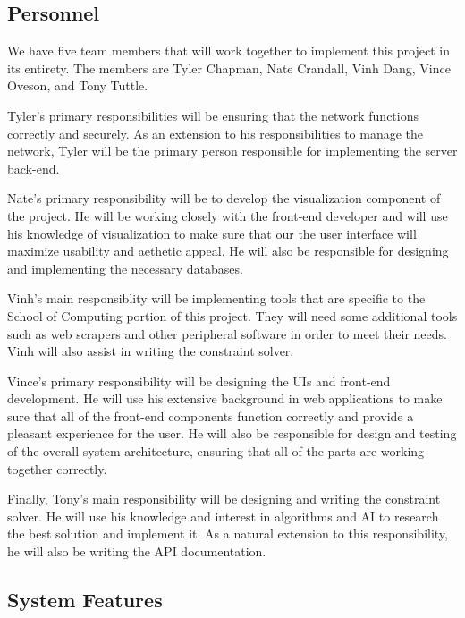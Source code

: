 \documentclass{extarticle}
\begin{document}
\subsection{Personnel}

We have five team members that will work together to implement this project in its entirety.  The members are
Tyler Chapman, Nate Crandall, Vinh Dang, Vince Oveson, and Tony Tuttle.

Tyler's primary responsibilities will be ensuring that the network functions correctly and securely.  As an
extension to his responsibilities to manage the network, Tyler will be the primary person responsible for
implementing the server back-end.

Nate's primary responsibility will be to develop the visualization component of the project.  He will be working
closely with the front-end developer and will use his knowledge of visualization to make sure that our the user
interface will maximize usability and aethetic appeal.  He will also be responsible for designing and implementing
the necessary databases.

Vinh's main responsiblity will be implementing tools that are specific to the School of Computing portion of this
project.  They will need some additional tools such as web scrapers and other peripheral software in order to meet
their needs.  Vinh will also assist in writing the constraint solver.

Vince's primary responsibility will be designing the UIs and front-end development.  He will use his extensive
background in web applications to make sure that all of the front-end components function correctly and provide a
pleasant experience for the user.  He will also be responsible for design and testing of the overall system
architecture, ensuring that all of the parts are working together correctly.

Finally, Tony's main responsibility will be designing and writing the constraint solver.  He will use his knowledge
and interest in algorithms and AI to research the best solution and implement it.  As a natural extension to this
responsibility, he will also be writing the API documentation.

\subsection{System Features}
\end{document}
